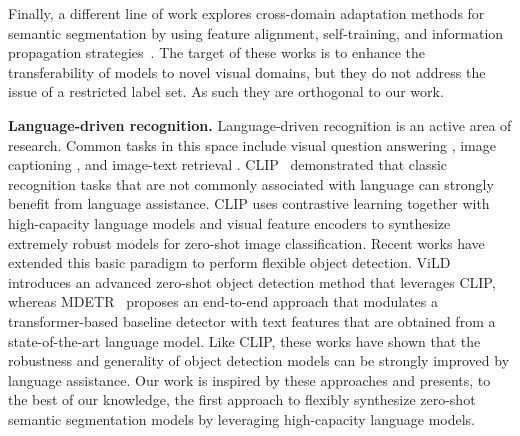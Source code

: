 Finally, a different line of work explores cross-domain adaptation methods for semantic segmentation by using feature alignment, self-training, and information propagation strategies~\citep{yang2021exploring,wang2021give}. The target of these works is to enhance the transferability of models to novel visual domains, but they do not address the issue of a restricted label set. As such they are orthogonal to our work.

\textbf{Language-driven recognition.}
Language-driven recognition is an active area of research. Common tasks in this space 
include visual question answering \citep{antol2015}, image captioning \citep{vinyals2014}, and image-text retrieval \citep{li20unienc}. CLIP~\citep{radford2021learning} demonstrated that classic recognition tasks that are not commonly associated with 
language can strongly benefit from language assistance. CLIP uses contrastive learning  together with high-capacity language models and visual feature encoders to synthesize extremely robust models for zero-shot image classification. Recent works have extended this basic paradigm to perform flexible object detection. ViLD~\citep{gu2021zero} introduces an advanced zero-shot object detection method that leverages CLIP, whereas MDETR~\citep{kamath2021mdetr} proposes an end-to-end approach that modulates a transformer-based baseline detector with text features that are obtained from a state-of-the-art language model. Like CLIP, these works have shown that the robustness and generality of object detection models can be strongly improved by language assistance. Our work is inspired by these approaches and presents, to the best of our knowledge, the first approach to flexibly synthesize zero-shot semantic segmentation models by leveraging high-capacity language models.

